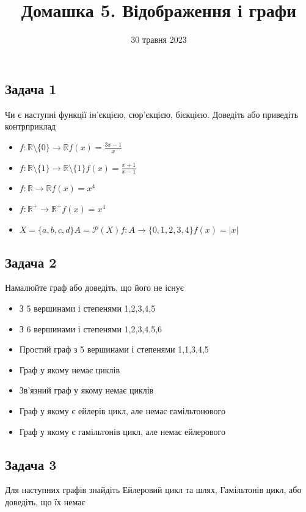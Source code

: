 \documentclass{article}
\begin{document}
\title{Домашка 5. Відображення і графи}
\date{30 травня 2023}

\maketitle

\subsection*{Задача 1}
Чи є наступні функції ін'єкцією, сюр'єкцією, бієкцією. Доведіть або приведіть контрприклад
\begin{itemize}
    \item $f: \mathbb{R} \setminus \{0\} \rightarrow \mathbb{R} f(x)=\frac{3x-1}{x}$
    \item $f: \mathbb{R} \setminus \{1\} \rightarrow \mathbb{R} \setminus \{1\} f(x)=\frac{x+1}{x-1}$
    \item $f: \mathbb{R} \rightarrow \mathbb{R} f(x)=x^4$
    \item $f: \mathbb{R}^+ \rightarrow \mathbb{R}^+ f(x)=x^4$
    \item $X=\{a,b,c,d\} A=\mathcal{P}(X) f: A \rightarrow \{0,1,2,3,4\} f(x) = |x|$
\end{itemize}

\subsection*{Задача 2}
Намалюйте граф або доведіть, що його не існує
\begin{itemize}
    \item З 5 вершинами і степенями 1,2,3,4,5
    \item З 6 вершинами і степенями 1,2,3,4,5,6
    \item Простий граф з 5 вершинами і степенями 1,1,3,4,5
    \item Граф у якому немає циклів
    \item Зв'язний граф у якому немає циклів
    \item Граф у якому є ейлерів цикл, але немає гамільтонового
    \item Граф у якому є гамільтонів цикл, але немає ейлерового
\end{itemize}

\subsection*{Задача 3}
Для наступних графів знайдіть Ейлеровий цикл та шлях, Гамільтонів цикл, або доведіть, що їх немає
\pagebreak
\end{document}
